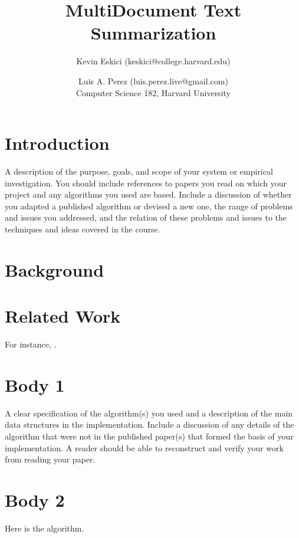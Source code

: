 \documentclass[11pt]{article}
\title{MultiDocument Text Summarization}
\author{Kevin Eskici (keskici@college.harvard.edu) \and Luis A. Perez (luis.perez.live@gmail.com)\\
Computer Science 182, Harvard University}
\begin{document}
\maketitle{}


\section{Introduction}


A description of the purpose, goals, and scope of your system or
empirical investigation.  You should include references to papers you
read on which your project and any algorithms you used are
based. Include a discussion of whether you adapted a published
algorithm or devised a new one, the range of problems and issues you
addressed, and the relation of these problems and issues to the
techniques and ideas covered in the course.

\section{Background}


\section{Related Work}

For instance, \cite{hochreiter1997long}.


\section{Body 1}

A clear specification of the algorithm(s) you used and a description
of the main data structures in the implementation. Include a
discussion of any details of the algorithm that were not in the
published paper(s) that formed the basis of your implementation. A
reader should be able to reconstruct and verify your work from reading
your paper.

\section{Body 2}


\begin{algorithm}
  \begin{algorithmic}
    \EndProcedure{}
  \end{algorithmic}
  \caption{Here is the algorithm.}
\end{algorithm}
\end{document}
